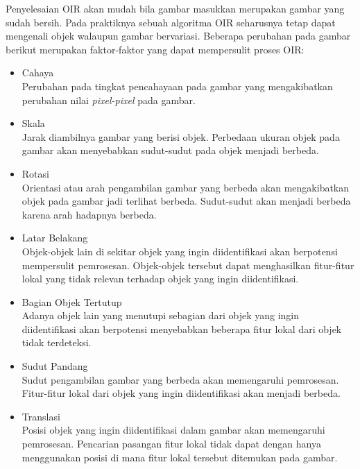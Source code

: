 Penyelesaian OIR akan mudah bila gambar masukkan merupakan gambar yang sudah bersih. Pada praktiknya sebuah algoritma OIR seharusnya tetap dapat mengenali objek walaupun gambar bervariasi. Beberapa perubahan pada gambar berikut merupakan faktor-faktor yang dapat mempersulit proses OIR:
\begin{itemize}
	\item Cahaya \\
	Perubahan pada tingkat pencahayaan pada gambar yang mengakibatkan perubahan nilai \textit{pixel-pixel} pada gambar.
	\item Skala \\
	Jarak diambilnya gambar yang berisi objek. Perbedaan ukuran objek pada gambar akan menyebabkan sudut-sudut pada objek menjadi berbeda.
	\item Rotasi \\
	Orientasi atau arah pengambilan gambar yang berbeda akan mengakibatkan objek pada gambar jadi terlihat berbeda. Sudut-sudut akan menjadi berbeda karena arah hadapnya berbeda.
	\item Latar Belakang \\
	Objek-objek lain di sekitar objek yang ingin diidentifikasi akan berpotensi mempersulit pemrosesan. Objek-objek tersebut dapat menghasilkan fitur-fitur lokal yang tidak relevan terhadap objek yang ingin diidentifikasi.
	\item Bagian Objek Tertutup \\
	Adanya objek lain yang menutupi sebagian dari objek yang ingin diidentifikasi akan berpotensi menyebabkan beberapa fitur lokal dari objek tidak terdeteksi.
	\item Sudut Pandang \\
	Sudut pengambilan gambar yang berbeda akan memengaruhi pemrosesan. Fitur-fitur lokal dari objek yang ingin diidentifikasi akan menjadi berbeda.
	\item Translasi \\
	Posisi objek yang ingin diidentifikasi dalam gambar akan memengaruhi pemrosesan. Pencarian pasangan fitur lokal tidak dapat dengan hanya menggunakan posisi di mana fitur lokal tersebut ditemukan pada gambar.
\end{itemize}
